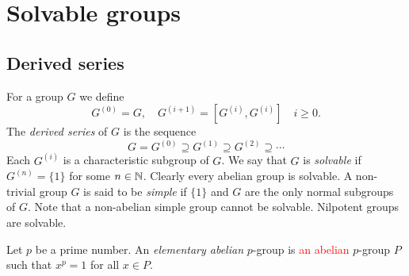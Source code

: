 \chapter{Solvable groups}
\label{solvable}



\section{Derived series}

For a group $G$ we define 
\[
		G^{(0)}=G,\quad
		G^{(i+1)}=[G^{(i)},G^{(i)}]\quad i\geq0.
\]
The {\em derived series} of $G$ is the sequence 
\[
G=G^{(0)}\supseteq G^{(1)}\supseteq G^{(2)}\supseteq\cdots
\]
Each $G^{(i)}$ is a characteristic subgroup of $G$. We say that 
$G$ is {\em solvable} if $G^{(n)}=\{1\}$ for some  $n\in\mathbb{N}$. Clearly every abelian group
is solvable. A non-trivial group $G$ is said to be {\em simple} if $\{ 1\}$ and $G$ are the only normal subgroups of $G$. Note that a non-abelian simple group cannot be solvable. Nilpotent groups
are solvable.


Let $p$ be a prime number. An {\em elementary abelian} $p$-group is \textcolor{red}{an abelian} $p$-group 
$P$ such that $x^p=1$ for all $x\in P$.





